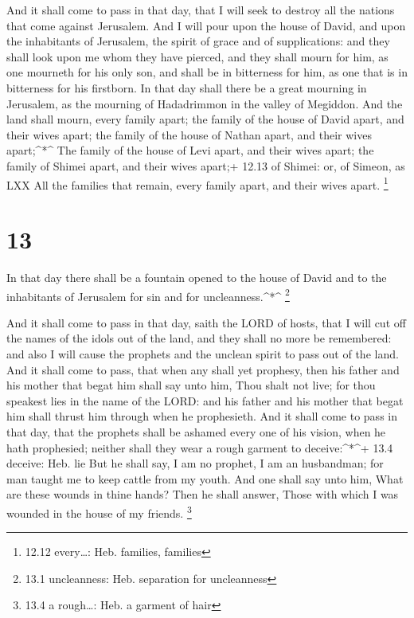  And it shall come to pass in that day, that I will seek to
destroy all the nations that come against Jerusalem.  And I
will pour upon the house of David, and upon the inhabitants of
Jerusalem, the spirit of grace and of supplications: and they shall look
upon me whom they have pierced, and they shall mourn for him, as one
mourneth for his only son, and shall be in bitterness for him, as one
that is in bitterness for his firstborn.  In that day shall
there be a great mourning in Jerusalem, as the mourning of Hadadrimmon
in the valley of Megiddon.  And the land shall mourn, every
family apart; the family of the house of David apart, and their wives
apart; the family of the house of Nathan apart, and their wives
apart;\^{}*\^{}  The family of the house of Levi apart, and
their wives apart; the family of Shimei apart, and their wives apart;+
12.13 of Shimei: or, of Simeon, as LXX  All the families
that remain, every family apart, and their wives apart. \footnote{12.12
  every\ldots: Heb. families, families}

\hypertarget{section-12}{%
\section{13}\label{section-12}}

 In that day there shall be a fountain opened to the house
of David and to the inhabitants of Jerusalem for sin and for
uncleanness.\^{}*\^{} \footnote{13.1 uncleanness: Heb. separation for
  uncleanness}

 And it shall come to pass in that day, saith the LORD of
hosts, that I will cut off the names of the idols out of the land, and
they shall no more be remembered: and also I will cause the prophets and
the unclean spirit to pass out of the land.  And it shall
come to pass, that when any shall yet prophesy, then his father and his
mother that begat him shall say unto him, Thou shalt not live; for thou
speakest lies in the name of the LORD: and his father and his mother
that begat him shall thrust him through when he prophesieth.
 And it shall come to pass in that day, that the prophets
shall be ashamed every one of his vision, when he hath prophesied;
neither shall they wear a rough garment to deceive:\^{}*\^{}+ 13.4
deceive: Heb. lie  But he shall say, I am no prophet, I am
an husbandman; for man taught me to keep cattle from my youth.
 And one shall say unto him, What are these wounds in thine
hands? Then he shall answer, Those with which I was wounded in the house
of my friends. \footnote{13.4 a rough\ldots: Heb. a garment of hair}

